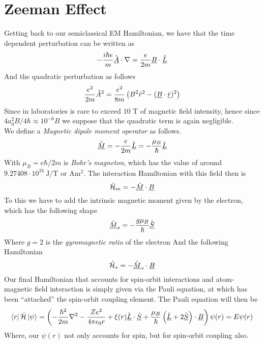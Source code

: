 \documentclass[../qm.tex]{subfiles}
\begin{document}
	\section{Zeeman Effect}
	Getting back to our semiclassical EM Hamiltonian, we have that the time dependent perturbation can be written as
	\begin{equation*}
		-\frac{i\hbar e}{m}\hat{\underline{A}}\cdot\nabla=\frac{e}{2m}\underline{B}\cdot\hat{\underline{L}}
	\end{equation*}
	And the quadratic perturbation as follows
	\begin{equation*}
		\frac{e^2}{2m}\hat{A}^2=\frac{e^2}{8m}\left( B^2\hat{r}^2-(\underline{B}\cdot\hat{\underline{r}})^2 \right)
	\end{equation*}
	Since in laboratories is rare to exceed $10$ T of magnetic field intensity, hence since $4a_0^2B/4\hbar\approx 10^{-6}B$ we suppose that the quadratic term is again negligible.\\
	We define a \textit{Magnetic dipole moment operator} as follows.\\
	\begin{equation}
		\hat{\underline{M}}=-\frac{e}{2m}\hat{\underline{L}}=-\frac{\mu_B}{\hbar}\hat{\underline{L}}
		\label{eq:mmomopr}
	\end{equation}
	With $\mu_B=e\hbar/2m$ is \textit{Bohr's magneton}, which has the value of around $9.27408\cdot10^{24}\ \mathrm{J/T}$ or $\mathrm{Am^2}$. The interaction Hamiltonian with this field then is
	\begin{equation}
		\hat{\mathcal{H}}_{m}=-\hat{\underline{M}}\cdot\underline{B}
		\label{eq:interactionhammag}
	\end{equation}
	To this we have to add the intrinsic magnetic moment given by the electron, which has the following shape
	\begin{equation}
		\hat{\underline{M}}_s=-\frac{g\mu_B}{\hbar}\hat{\underline{S}}
		\label{eq:spinmmopr}
	\end{equation}
	Where $g=2$ is the \textit{gyromagnetic ratio} of the electron
	And the following Hamiltonian
	\begin{equation}
		\hat{\mathcal{H}}_s=-\hat{\underline{M}}_s\cdot\underline{B}
		\label{eq:interactionhamspin}
	\end{equation}
	Our final Hamiltonian that accounts for spin-orbit interactions and atom-magnetic field interaction is simply given via the Pauli equation, at which has been ``attached'' the spin-orbit coupling element. The Pauli equation will then be %
	\begin{equation}
		\bra{r}\hat{\mathcal{H}}\ket{\psi}=\left( -\frac{\hbar^2}{2m}\nabla^2-\frac{Ze^2}{4\pi\epsilon_0r}+\xi(r)\hat{\underline{L}}\cdot\hat{\underline{S}}+\frac{\mu_B}{\hbar}\left( \hat{\underline{L}}+2\hat{\underline{S}} \right)\cdot\underline{B} \right)\psi(r)=E\psi(r)
		\label{eq:sopauliequation}
	\end{equation}
	Where, our $\psi(r)$ not only accounts for spin, but for spin-orbit coupling also.
\end{document}
